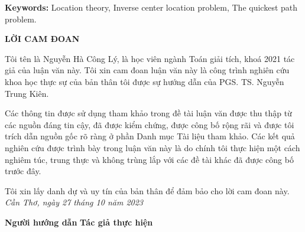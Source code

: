 \documentclass[12pt,oneside,a4paper]{bookAnh1}
\theoremstyle{plain}
\theoremstyle{nonumberplain}
\numberwithin{equation}{chapter}
\begin{document}
\textbf{Keywords:} Location theory, Inverse center location problem, The quickest path problem.
\newpage
\centerline{\bf\fontsize{14pt}{120}\selectfont LỜI CAM ĐOAN}
\vskip1cm
Tôi tên là Nguyễn Hà Công Lý, là học viên ngành Toán giải tích, khoá 2021 tác giả của luận văn này. Tôi xin cam đoan luận văn này là công trình nghiên cứu khoa học thực sự của bản thân tôi được sự hướng dẫn của PGS. TS. Nguyễn Trung Kiên.

Các thông tin được sử dụng tham khảo trong đề tài luận văn được thu thập từ các nguồn đáng tin cậy, đã được kiểm chứng, được công bố rộng rãi và được tôi trích dẫn nguồn gốc rõ ràng ở phần Danh mục Tài liệu tham khảo. Các kết quả nghiên cứu được trình bày trong luận văn này là do chính tôi thực hiện một cách nghiêm túc, trung thực và không trùng lắp với các đề tài khác đã được công bố trước đây.

Tôi xin lấy danh dự và uy tín của bản thân để đảm bảo cho lời cam đoan này.\\

\hspace*{0.2in}\hfill{\textit{Cần Thơ, ngày 27 tháng 10 năm 2023}}

  \hskip 1cm \textbf{\textbf{Người hướng dẫn}}	    \hskip 5.8cm \textbf{Tác giả thực hiện}
\vspace*{2.5cm}

\end{document}

